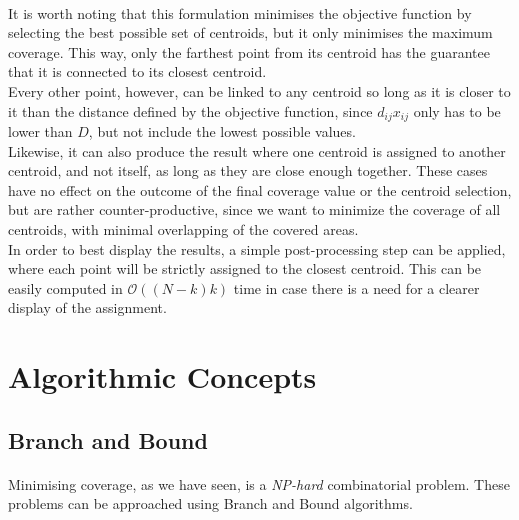 \paragraph{}
It is worth noting that this formulation minimises the objective function by selecting the best possible set of centroids, but it only minimises the maximum coverage. This way, only the farthest point from its centroid has the guarantee that it is connected to its closest centroid.\\
Every other point, however, can be linked to any centroid so long as it is closer to it than the distance defined by the objective function, since $d_{ij}x_{ij}$ only has to be lower than $D$, but not include the lowest possible values.\\
Likewise, it can also produce the result where one centroid is assigned to another centroid, and not itself, as long as they are close enough together.
These cases have no effect on the outcome of the final coverage value or the centroid selection, but are rather counter-productive, since we want to minimize the coverage of all centroids, with minimal overlapping of the covered areas.\\
In order to best display the results, a simple post-processing step can be applied, where each point will be strictly assigned to the closest centroid. This can be easily computed in $\mathcal{O}((N-k)k)$ time in case there is a need for a clearer display of the assignment.
\section{Algorithmic Concepts}
\subsection{Branch and Bound}
\paragraph{}
Minimising coverage, as we have seen, is a \textit{NP-hard} combinatorial problem. These problems can be approached using Branch and Bound algorithms.
